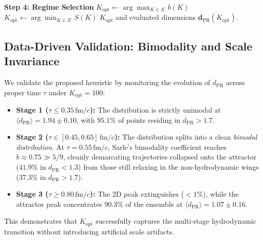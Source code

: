 \begin{algorithm}[htbp]
\begin{algorithmic}[1]
\State \textbf{Step 4: Regime Selection}
    \State $K_{\mathrm{opt}} \gets \arg\max_{K \in \mathcal{K}} b(K)$
\Else {}
    \State $K_{\mathrm{opt}} \gets \arg\min_{K \in \mathcal{K}} S(K)$ 
\EndIf
\State \Return $K_{\mathrm{opt}}$ and evaluated dimensions $\mathbf{d}_{\mathrm{PR}}(K_{\mathrm{opt}})$.
\end{algorithmic}
\end{algorithm}

\subsection{Data-Driven Validation: Bimodality and Scale Invariance}
\label{subsec:bimodality_validation}
We validate the proposed heuristic by monitoring the evolution of $d_{\mathrm{PR}}$ across proper time $\tau$ under $K_{\mathrm{opt}} = 100$:
\begin{itemize}
    \item \textbf{Stage 1 ($\tau \le 0.35\,\mathrm{fm}/c$):} The distribution is strictly unimodal at $\langle d_{\mathrm{PR}} \rangle = 1.94 \pm 0.10$, with $95.1\%$ of points residing in $d_{\mathrm{PR}} > 1.7$.
    \item \textbf{Stage 2 ($\tau \in [0.45, 0.65]\,\mathrm{fm}/c$):} The distribution splits into a clean \emph{bimodal distribution}. At $\tau = 0.55\,\mathrm{fm}/c$, Sarle's bimodality coefficient reaches $b \approx 0.75 \gg 5/9$, cleanly demarcating trajectories collapsed onto the attractor ($41.9\%$ in $d_{\mathrm{PR}} < 1.3$) from those still relaxing in the non-hydrodynamic wings ($37.3\%$ in $d_{\mathrm{PR}} > 1.7$).
    \item \textbf{Stage 3 ($\tau \ge 0.80\,\mathrm{fm}/c$):} The 2D peak extinguishes ($<1\%$), while the attractor peak concentrates $90.3\%$ of the ensemble at $\langle d_{\mathrm{PR}} \rangle = 1.07 \pm 0.16$.
\end{itemize}
This demonstrates that $K_{\mathrm{opt}}$ successfully captures the multi-stage hydrodynamic transition without introducing artificial scale artifacts.
